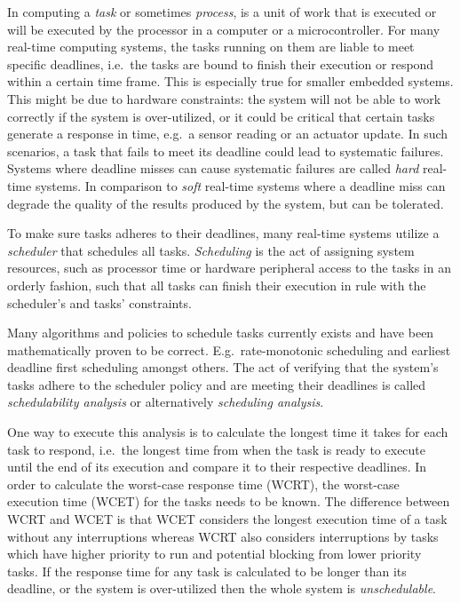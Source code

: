 In computing a \emph{task} or sometimes \emph{process}, is a unit of work that
is executed or will be executed by the processor in a computer or a
microcontroller.  For many real-time computing systems, the tasks running on
them are liable to meet specific deadlines, i.e.\ the tasks are bound to finish
their execution or respond within a certain time frame. This is especially true
for smaller embedded systems. This might be due to hardware constraints: the
system will not be able to work correctly if the system is over-utilized, or it
could be critical that certain tasks generate a response in time, e.g.\ a
sensor reading or an actuator update. In such scenarios, a task that fails to
meet its deadline could lead to systematic failures. Systems where deadline
misses can cause systematic failures are called \emph{hard} real-time systems.
In comparison to \emph{soft} real-time systems where a deadline miss can
degrade the quality of the results produced by the system, but can be
tolerated\cite{hardrealtimecomputingsystems}.

To make sure tasks adheres to their deadlines, many real-time systems utilize
a \emph{scheduler} that schedules all tasks. \emph{Scheduling} is the act of
assigning system resources, such as processor time or hardware peripheral
access to the tasks in an orderly fashion, such that all tasks can finish their
execution in rule with the scheduler's and tasks' constraints.

Many algorithms and policies to schedule tasks currently exists and have been
mathematically proven to be correct.  E.g.\ rate-monotonic
scheduling\cite{ratemonotonic} and earliest deadline first scheduling\cite{edf}
amongst others.  The act of verifying that the system's tasks adhere to the
scheduler policy and are meeting their deadlines is called \emph{schedulability
analysis} or alternatively \emph{scheduling analysis}.

One way to execute this analysis is to calculate the longest time it takes for
each task to respond, i.e.\ the longest time from when the task is ready to
execute until the end of its execution and compare it to their respective
deadlines.  In order to calculate the worst-case response time (WCRT), the
worst-case execution time (WCET) for the tasks needs to be known. The
difference between WCRT and WCET is that WCET considers the longest execution
time of a task without any interruptions whereas WCRT also considers
interruptions by tasks which have higher priority to
run and potential blocking from lower priority
tasks\cite{hardrealtimecomputingsystems}. If the response time for any task is
calculated to be longer than its deadline, or the system is over-utilized then
the whole system is \emph{unschedulable}.

